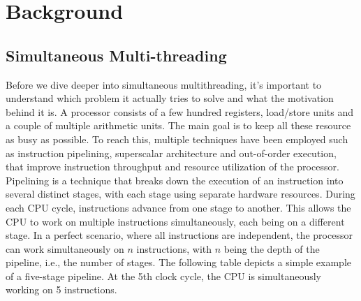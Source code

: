 \chapter{Background}\label{chapter:background}
\section{Simultaneous Multi-threading}
Before we dive deeper into simultaneous multithreading, it's important to understand which problem it actually 
tries to solve and what the motivation behind it is. 
A processor consists of a few hundred registers, load/store units and a couple of multiple arithmetic units. 
The main goal is to keep all these resource as busy as possible. To reach this, multiple techniques have been 
employed such as instruction pipelining, superscalar architecture and out-of-order execution, that improve 
instruction throughput and resource utilization of the processor.
Pipelining is a technique that breaks down the execution of an instruction into several distinct stages, 
with each stage using separate hardware resources. During each CPU cycle, instructions advance from one stage 
to another. This allows the CPU to work on multiple instructions simultaneously, each being on a different 
stage. In a perfect scenario, where all instructions are independent, the processor can work simultaneously 
on \begin{math}n\end{math} instructions, with \begin{math}n\end{math} being the depth of the pipeline, i.e., 
the number of stages. The following table depicts a simple example of a five-stage pipeline. 
At the 5th clock cycle, the CPU is simultaneously working on 5 instructions. \\ 

